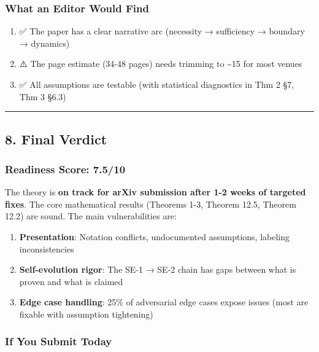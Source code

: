 \documentclass[
  12pt,
]{ctexart}
\providecommand{\tightlist}{%
  \setlength{\itemsep}{0pt}\setlength{\parskip}{0pt}}
\begin{document}
\subsubsection{What an Editor Would
Find}\label{what-an-editor-would-find}

\begin{enumerate}
\def\labelenumi{\arabic{enumi}.}
\tightlist
\item
  ✅ The paper has a clear narrative arc (necessity → sufficiency →
  boundary → dynamics)
\item
  ⚠️ The page estimate (34-48 pages) needs trimming to \textasciitilde15
  for most venues
\item
  ✅ All assumptions are testable (with statistical diagnostics in Thm 2
  §7, Thm 3 §6.3)
\end{enumerate}

\begin{center}\rule{0.5\linewidth}{0.5pt}\end{center}

\subsection{8. Final Verdict}\label{final-verdict}

\subsubsection{Readiness Score: 7.5/10}\label{readiness-score-7.510}

The theory is \textbf{on track for arXiv submission after 1-2 weeks of
targeted fixes}. The core mathematical results (Theorems 1-3, Theorem
12.5, Theorem 12.2) are sound. The main vulnerabilities are:

\begin{enumerate}
\def\labelenumi{\arabic{enumi}.}
\tightlist
\item
  \textbf{Presentation}: Notation conflicts, undocumented assumptions,
  labeling inconsistencies
\item
  \textbf{Self-evolution rigor}: The SE-1 → SE-2 chain has gaps between
  what is proven and what is claimed
\item
  \textbf{Edge case handling}: 25\% of adversarial edge cases expose
  issues (most are fixable with assumption tightening)
\end{enumerate}

\subsubsection{If You Submit Today}\label{if-you-submit-today}
\end{document}
